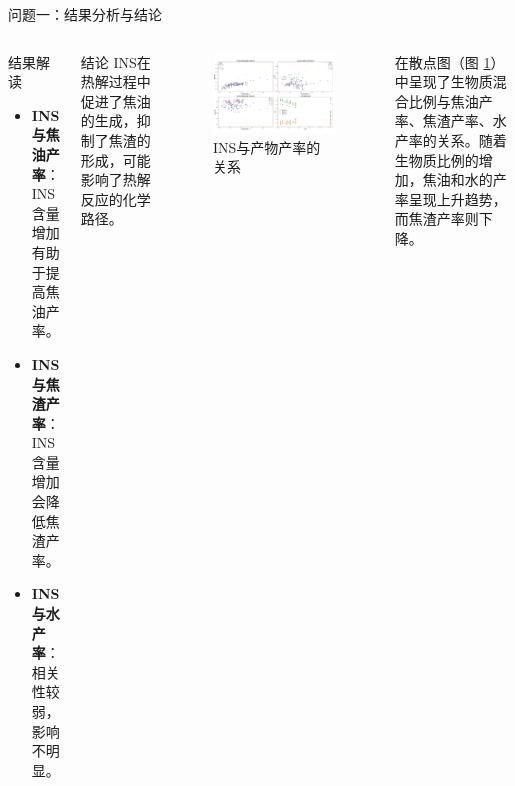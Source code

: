 \documentclass{beamer}
\begin{document}
\begin{frame}{问题一：结果分析与结论}
    \small
    \justifying
    \begin{columns}
        \begin{block}{结果解读}
            \begin{itemize}
                \item \textbf{INS与焦油产率}：INS含量增加有助于提高焦油产率。
                \item \textbf{INS与焦渣产率}：INS含量增加会降低焦渣产率。
                \item \textbf{INS与水产率}：相关性较弱，影响不明显。
            \end{itemize}
        \end{block}
        \begin{block}{结论}
            INS在热解过程中促进了焦油的生成，抑制了焦渣的形成，可能影响了热解反应的化学路径。
        \end{block}
        \begin{figure}[htbp]
            \centering
            \includegraphics[width=\linewidth]{pic/scatterplot.pdf}
            \caption{INS与产物产率的关系}
            \label{fig:scatterplot}
        \end{figure}
        在散点图（图 \ref{fig:scatterplot}）中呈现了生物质混合比例与焦油产率、焦渣产率、水产率的关系。随着生物质比例的增加，焦油和水的产率呈现上升趋势，而焦渣产率则下降。
    \end{columns}

\end{frame}
\end{document}
